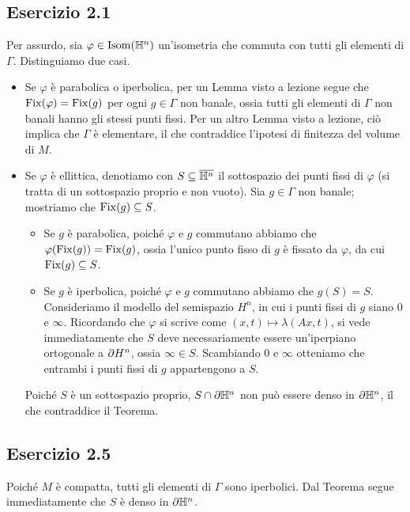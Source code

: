 \subsection*{Esercizio 2.1}
Per assurdo, sia $\varphi\in\operatorname{Isom}(\mathbb{H}^n)$ un'isometria che commuta con tutti gli elementi di $\Gamma$. Distinguiamo due casi.
\begin{itemize}
\item Se $\varphi$ è parabolica o iperbolica, per un Lemma visto a lezione segue che $\operatorname{Fix}(\varphi)=\operatorname{Fix}(g)$ per ogni $g\in\Gamma$ non banale, ossia tutti gli elementi di $\Gamma$ non banali hanno gli stessi punti fissi. Per un altro Lemma visto a lezione, ciò implica che $\Gamma$ è elementare, il che contraddice l'ipotesi di finitezza del volume di $M$.
\item Se $\varphi$ è ellittica, denotiamo con $S\subseteq\overline{\mathbb{H}^n}$ il sottospazio dei punti fissi di $\varphi$ (si tratta di un sottospazio proprio e non vuoto). Sia $g\in\Gamma$ non banale; mostriamo che $\operatorname{Fix}(g)\subseteq S$.
\begin{itemize}
\item Se $g$ è parabolica, poiché $\varphi$ e $g$ commutano abbiamo che $\varphi(\operatorname{Fix}(g))=\operatorname{Fix}(g)$, ossia l'unico punto fisso di $g$ è fissato da $\varphi$, da cui $\operatorname{Fix}(g)\subseteq S$.
\item Se $g$ è iperbolica, poiché $\varphi$ e $g$ commutano abbiamo che $g(S)=S$. Consideriamo il modello del semispazio $H^n$, in cui i punti fissi di $g$ siano $0$ e $\infty$. Ricordando che $\varphi$ si scrive come $(x,t)\mapsto\lambda(Ax,t)$, si vede immediatamente che $S$ deve necessariamente essere un'iperpiano ortogonale a $\partial H^n$, ossia $\infty\in S$. Scambiando $0$ e $\infty$ otteniamo che entrambi i punti fissi di $g$ appartengono a $S$.
\end{itemize}
Poiché $S$ è un sottospazio proprio, $S\cap\partial\mathbb{H}^n$ non può essere denso in $\partial\mathbb{H}^n$, il che contraddice il Teorema.
\end{itemize}

\subsection*{Esercizio 2.5}
Poiché $M$ è compatta, tutti gli elementi di $\Gamma$ sono iperbolici. Dal Teorema segue immediatamente che $S$ è denso in $\partial\mathbb{H}^n$.